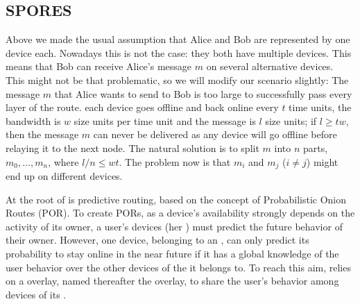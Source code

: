 \subsection{\Acf*{SPORES}}%
\label{SPORES}
\label{sec:squad_overlay}

Above we made the usual assumption that Alice and Bob are represented by one 
device each.
Nowadays this is not the case: they both have multiple devices.
This means that Bob can receive Alice's message \(m\) on several alternative 
devices.
This might not be that problematic, so we will modify our scenario slightly:
The message \(m\) that Alice wants to send to Bob is too large to successfully 
pass every layer of the route.
\Eg each device goes offline and back online every \(t\) time units, the 
bandwidth is \(w\) size units per time unit and the message is \(l\) size 
units; if \(l\geq t w\), then the message \(m\) can never be delivered as any 
device will go offline before relaying it to the next node.
The natural solution is to split \(m\) into \(n\) parts, \(m_0, \dotsc, m_n\), 
where \(l/n\leq w t\).
The problem now is that \(m_i\) and \(m_j\) (\(i\neq j\)) might end up on 
different devices.


At the root of \name is predictive routing, based on the concept of Probabilistic Onion Routes (POR).
To create PORs, as a device's availability strongly depends on the activity of its owner,
 a user's devices (her \squad) must predict the future behavior of their owner. 
However, one device, belonging to an \squad, can only predict its probability to stay online in the near future
if it has a global knowledge of the user behavior over the other devices of the \squad it belongs to.
To reach this aim, \name relies on a overlay, named thereafter the \squad overlay, to share the user's behavior among devices of its \squad.





